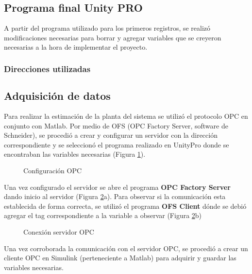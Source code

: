 \subsection{Programa final Unity PRO}

A partir del programa utilizado para los primeros registros, se realizó modificaciones necesarias para borrar y agregar variables que se creyeron necesarias a la hora de implementar el proyecto.


\subsubsection{Direcciones utilizadas}


\subsection{Adquisición de datos}
Para realizar la estimación de la planta del sistema se utilizó el protocolo OPC en conjunto con Matlab. Por medio de OFS (OPC Factory Server, software de Schneider), se procedió a crear y configurar un servidor con la dirección correspondiente y se seleccionó el programa realizado en UnityPro donde se encontraban las variables necesarias (Figura \ref{fig:opc1}).

\begin{figure}[htbp]
	\centering
	\caption{Configuración OPC} \label{fig:opc1}
\end{figure}


Una vez configurado el servidor se abre el programa \textbf{OPC Factory Server} dando inicio al servidor (Figura \ref{fig:opc2}a). Para observar si la comunicación esta establecida de forma correcta, se utilizó el programa \textbf{OFS Client} dónde se debió agregar el tag correspondiente a la variable a observar (Figura \ref{fig:opc2}b)

\begin{figure}[htbp]
	\centering
	\caption{Conexión servidor OPC} \label{fig:opc2}
\end{figure}

Una vez corroborada la comunicación con el servidor OPC, se procedió a crear un cliente OPC en Simulink (perteneciente a Matlab) para adquirir y guardar las variables necesarias. 


